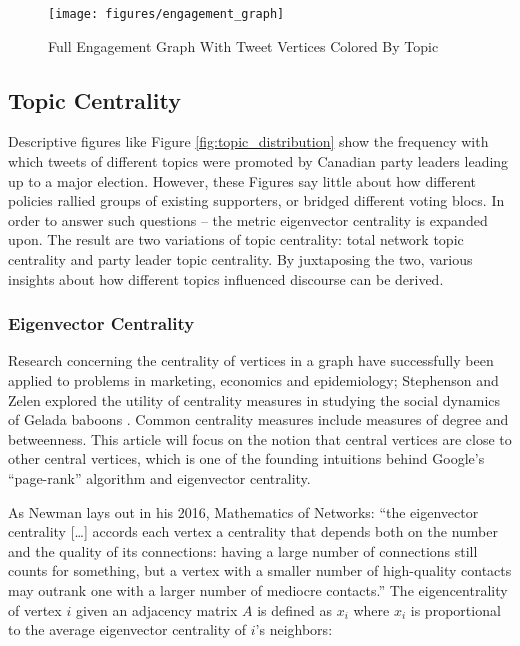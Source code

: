 \begin{figure}[h!]
  \centering
  \texttt{[image: figures/engagement\_graph]}
  \caption[Full Engagement Graph]{Full Engagement Graph With Tweet Vertices Colored By Topic}
  \label{fig:engagement_graph}
\end{figure}

\subsection{Topic Centrality}

Descriptive figures like Figure \ref{fig:topic_distribution} show the frequency
with which tweets of different topics were promoted by Canadian party leaders
leading up to a major election. However, these Figures say little about how
different policies rallied groups of existing supporters, or bridged different
voting blocs. In order to answer such questions – the metric eigenvector
centrality is expanded upon. The result are two variations of topic centrality:
total network topic centrality and party leader topic centrality. By juxtaposing
the two, various insights about how different topics influenced discourse can be
derived.

\subsubsection{Eigenvector Centrality}

Research concerning the centrality of vertices in a graph have successfully been
applied to problems in marketing, economics and epidemiology; Stephenson and
Zelen explored the utility of centrality measures in studying the social
dynamics of Gelada baboons \cite{stephenson1989rethinking}. Common centrality
measures include measures of degree and betweenness. This article will focus on
the notion that central vertices are close to other central vertices, which is
one of the founding intuitions behind Google’s “page-rank” algorithm and
eigenvector centrality.

As Newman lays out in his 2016, Mathematics of Networks: ``the eigenvector
centrality [\dots] accords each vertex a centrality that depends both on the
number and the quality of its connections: having a large number of connections
still counts for something, but a vertex with a smaller number of high-quality
contacts may outrank one with a larger number of mediocre contacts.''
\cite{newman2008mathematics} The eigencentrality of vertex $i$ given an
adjacency matrix $A$ is defined as $x_i$ where $x_i$ is proportional to the
average eigenvector centrality of $i$’s neighbors:

